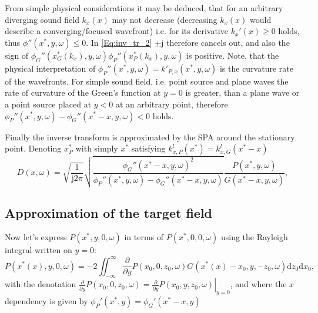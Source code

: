 \documentclass[12pt,a4paper]{article}
\newcommand{\td}{\mathrm{d}}
\newcommand{\ti}{\mathrm{j}}
\begin{document}
From simple physical considerations it may be deduced, that for an arbitrary diverging sound field $k_x(x)$ may not decrease (decreasing $k_x(x)$ would describe a converging/focused wavefront) i.e. for its derivative $k_x'(x) \geq 0$ holds, thus $\phi''(x^*,y,\omega)\leq 0$.
In \eqref{Eq:inv_tr_2} $\pm \ti$ therefore cancels out, and also the sign of $\phi_G''(x_G^*(k_x),y,\omega) \phi_P''(x_P^*(k_x),y,\omega)$ is positive. 
Note, that the physical interpretation of $\phi_P''(x^*,y,\omega) = k'_{P,x}(x^*,y,\omega)$ is the curvature rate of the wavefronts. For simple sound field, i.e. point source and plane waves the rate of curvature of the Green's function at $y = 0$ is greater, than a plane wave or a point source placed at $y<0$ at an arbitrary point, therefore $\phi_P''(x^*,y,\omega) - \phi_G''(x^*- x,y,\omega)<0$ holds.

Finally the inverse transform is approximated by the SPA around the stationary point. Denoting $x_P^*$ with simply $x^*$ satisfying $k_{x,P}^l(x^*) = k_{x,G}^l(x^*-x)$
\begin{equation}
D(x,\omega) = 
\sqrt{\frac{1}{\ti2\pi}}
\sqrt{\frac{\phi_G''(x^*- x,y,\omega)^2}{\phi_P''(x^*,y,\omega) - \phi_G''(x^*- x,y,\omega)}}
\frac{ P(x^*,y,\omega) }{G(x^*- x,y,\omega) },
\label{eq:driv_fun_on_ref}
\end{equation}

\subsection{Approximation of the target field}
Now let's express $P(x^*,y,0,\omega)$ in terms of $P(x^*,0,0,\omega)$ using the Rayleigh integral written on $y=0$:
\begin{equation}
P(x^*(x),y,0,\omega) = -2\iint_{-\infty}^{\infty} \frac{\partial}{\partial y} P(x_0,0,z_0,\omega) G(x^*(x)-x_0,y,-z_0,\omega) \td z_0 \td x_0,
\end{equation}
with the denotation $ \frac{\partial}{\partial y} P(x_0,0,z_0,\omega) = \left.  \frac{\partial}{\partial y} P(x_0,y,z_0,\omega) \right|_{y = 0}$,
and where the $x$ dependency is given by $\phi_P'(x^*,y) = \phi_G'(x^*-x,y)$
\end{document}
